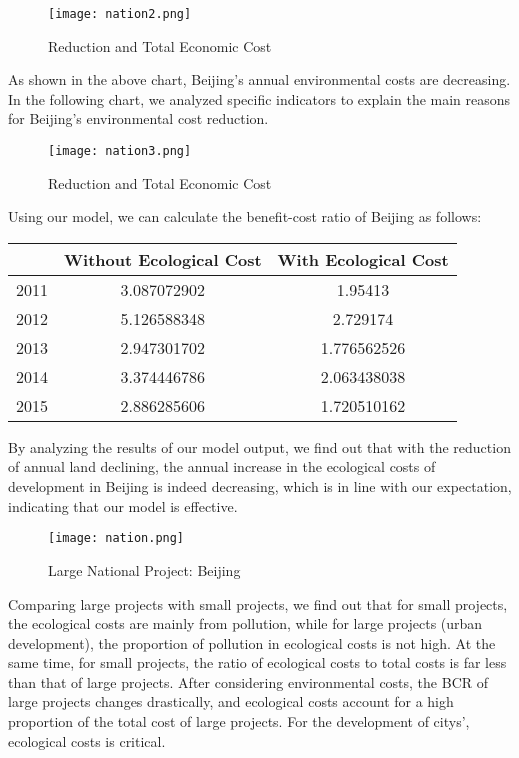 \documentclass{mcmthesis}
\begin{document}
		\begin{figure}[h]
			\small
			\centering
			\texttt{[image: nation2.png]}
			\caption{Reduction and Total Economic Cost}
			\label{fig:nation2}
		\end{figure}
		
		As shown in the above chart, Beijing's annual environmental costs are decreasing. In the following chart, we analyzed specific indicators to explain the main reasons for Beijing's environmental cost reduction.

		
		\begin{figure}[h]
			\small
			\centering
			\texttt{[image: nation3.png]}
			\caption{Reduction and Total Economic Cost}
			\label{fig:nation3}
		\end{figure}
	
		Using our model, we can calculate the benefit-cost ratio of Beijing as follows:
			
		\begin{table}[h]
			\centering
			\setlength{\tabcolsep}{3.7mm}
			\begin{tabular}{ccc}
				\toprule[1.5pt]  %
				& Without Ecological Cost & With Ecological Cost  \\
				\midrule  %
				2011& 3.087072902& 1.95413\\
				2012& 5.126588348& 2.729174\\
				2013& 2.947301702& 1.776562526\\
				2014& 3.374446786& 2.063438038\\
				2015& 2.886285606& 1.720510162\\	
				\bottomrule[1.5pt] %
			\end{tabular}
		\end{table}
		
		By analyzing the results of our model output, we find out that with the reduction of annual land declining, the annual increase in the ecological costs of development in Beijing is indeed decreasing, which is in line with our expectation, indicating that our model is effective.
		
		\begin{figure}[h]
			\small
			\centering
			\texttt{[image: nation.png]}
			\caption{Large National Project:  Beijing}
			\label{fig:nation}
		\end{figure}
		
		Comparing large projects with small projects, we find out that for small projects, the ecological costs are mainly from pollution, while for large projects (urban development), the proportion of pollution in ecological costs is not high. At the same time, for small projects, the ratio of ecological costs to total costs is far less than that of large projects. After considering environmental costs, the BCR of large projects changes drastically, and ecological costs account for a high proportion of the total cost of large projects. For the development of citys', ecological costs is critical.
		
\end{document}

